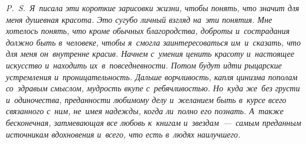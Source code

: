 \vspace{1cm}

\textit{
P.~S.~Я~писала эти короткие зарисовки жизни, чтобы понять, что значит для меня душевная красота.
Это сугубо личный взгляд на~эти понятия.
Мне хотелось понять, что кроме обычных благородства, доброты и~сострадания должно быть в~человеке, чтобы я~смогла заинтересоваться им~и~сказать, что для меня он~внутренне красив.
Начнем с~умения ценить красоту и~настоящее искусство и~находить их~в~повседневности.
Потом будут идти рыцарские устремления и~проницательность.
Дальше ворчливость, капля цинизма пополам со~здравым смыслом, мудрость вкупе с~ребячливостью.
Но~куда же~без грусти и~одиночества, преданности любимому делу и~желанием быть в~курсе всего связанного с~ним, не~имея надежды, когда ли~полно его познать.
А~также бесконечная, затмевающая все любовь к~книгам и~звездам~---~самым преданным источникам вдохновения и~всего, что есть в~людях наилучшего.
}